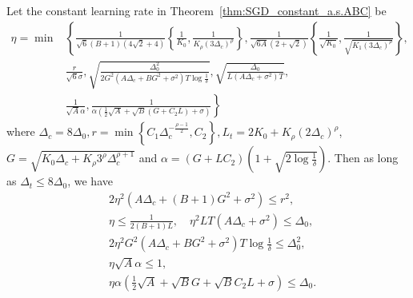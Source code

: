 \documentclass[10pt,a4paper]{amsart}
\newcommand{\Kr}{K_{\rho}}
\newcommand{\paren}[1]{\left( #1 \right)}
\begin{document}
\begin{lemma}\label{lem:sgd_stepsize_constant_ABC}
    Let the constant learning rate in Theorem~\ref{thm:SGD_constant_a.s.ABC} be 
    \begin{align*}
        \eta=\min&\left\{
        \frac{1}{\sqrt{6}(B+1)(4\sqrt{2}+4)}\left\{\frac{1}{K_0}, \frac{1}{\Kr\paren{3\Delta_c}^\rho}\right\},
        \frac{1}{\sqrt{6A}(2+\sqrt{2})}\left\{\frac{1}{\sqrt{K_0}}, \frac{1}{\sqrt{K_1 \paren{3\Delta_c}^\rho}}\right\},\right.\\
        &\left.\frac{r}{\sqrt{6}\sigma},\sqrt{\frac{\Delta_0^2}{2G^2\paren{A\Delta_c+BG^2+\sigma^2}T\log\frac{1}{\delta}}},
        \sqrt{\frac{\Delta_0}{L\paren{A\Delta_c+\sigma^2}T}}
        \right.,\\
        &\left.
        \frac{1}{\sqrt{A}\alpha}, \frac{1}{\alpha\paren{\frac{1}{2}\sqrt{A}+\sqrt{B}\paren{G+C_2L}+\sigma}}
        \right\}
    \end{align*}
    where $\Delta_c=8\Delta_0, r=\min\left\{C_1\Delta_c^{-\frac{\rho-1}{2}}, C_2\right\},L_t=2K_0+\Kr\paren{2\Delta_c}^\rho$, $G=\sqrt{K_0\Delta_c+\Kr 3^\rho\Delta_c^{\rho+1}}$ and $\alpha=\paren{G+LC_2}\paren{1+\sqrt{2\log\frac{1}{\delta}}}$. Then as long as $\Delta_t\leq 8\Delta_0$, we have
    \begin{align*}
        &2\eta^2\paren{A\Delta_c+(B+1)G^2+\sigma^2}\leq r^2,\\
        &\eta\leq\frac{1}{2(B+1)L},\quad\eta^2LT\paren{A\Delta_c+\sigma^2}\leq\Delta_0,\\
        &2\eta^2G^2\paren{A\Delta_c+BG^2+\sigma^2}T\log\frac{1}{\delta}\leq\Delta_0^2,\\
        &\eta\sqrt{A}\alpha\leq 1,\\
        &\eta\alpha\paren{\frac{1}{2}\sqrt{A}+\sqrt{B}G+\sqrt{B}C_2L+\sigma}\leq \Delta_0.
    \end{align*}
\end{lemma}
\end{document}
